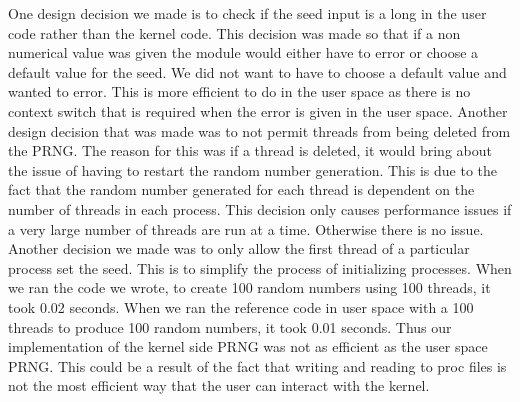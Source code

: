 \documentclass[12pt]{article}
\begin{document}
	One design decision we made is to check if the seed input is a long in the user code rather than the kernel code.
	This decision was made so that if a non numerical value was given the module would either have to error or choose a default value for the seed.
	We did not want to have to choose a default value and wanted to error. 
	This is more efficient to do in the user space as there is no context switch that is required when the error is given in the user space.
	Another design decision that was made was to not permit threads from being deleted from the PRNG. 
	The reason for this was if a thread is deleted, it would bring about the issue of having to restart the random number generation.
	This is due to the fact that the random number generated for each thread is dependent on the number of threads in each process. 
	 This decision only causes performance issues if a very large number of threads are run at a time. Otherwise there is no issue.  
	Another decision we made was to only allow the first thread of a particular process set the seed. This is to simplify the process of initializing processes. 
	When we ran the code we wrote, to create 100 random numbers using 100 threads, it took 0.02 seconds.
	When we ran the reference code in user space with a 100 threads to produce 100 random numbers, it took 0.01 seconds. 
	Thus our implementation of the kernel side PRNG was not as efficient as the user space PRNG.
	This could be a result of the fact that writing and reading to proc files is not the most efficient way that the user can interact with the kernel. 
\end{document}
